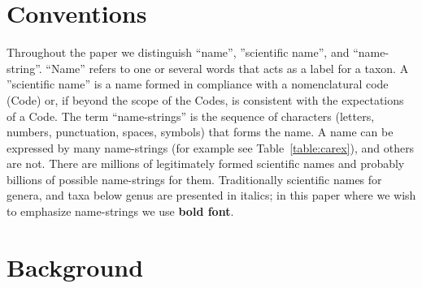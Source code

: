 \documentclass{bmcart}
\begin{document}


\section*{Conventions}

Throughout the paper we distinguish ``name'', ''scientific name'', and
``name-string''.  ``Name'' refers to one or several words that acts as a label for a taxon. A ''scientific name'' is a name formed in compliance with a nomenclatural code (Code) or, if beyond the scope of the Codes, is consistent with the expectations of a Code.  The term ``name-strings'' is the sequence of characters (letters, numbers, punctuation, spaces, symbols) that forms the name.  A name can be expressed by many name-strings (for example see Table~\ref{table:carex}), and others are not.  There are millions of legitimately formed scientific names and probably billions
of possible name-strings for them. Traditionally scientific names for genera, and taxa below genus are presented in italics; in this paper where we wish to emphasize name-strings we use  \textbf{bold font}.

\section*{Background}
\end{document}
